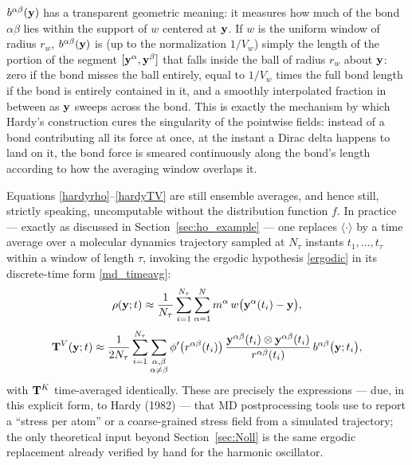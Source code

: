 \begin{remark}\label{rem:bondfunction}
	$b^{\alpha\beta}(\mathbf{y})$ has a transparent geometric meaning: it measures how much of the bond $\alpha\beta$ lies within the support of $w$ centered at $\mathbf{y}$. If $w$ is the uniform window of radius $r_w$, $b^{\alpha\beta}(\mathbf{y})$ is (up to the normalization $1/V_w$) simply the length of the portion of the segment $[\mathbf{y}^\alpha,\mathbf{y}^\beta]$ that falls inside the ball of radius $r_w$ about $\mathbf{y}$: zero if the bond misses the ball entirely, equal to $1/V_w$ times the full bond length if the bond is entirely contained in it, and a smoothly interpolated fraction in between as $\mathbf{y}$ sweeps across the bond. This is exactly the mechanism by which Hardy's construction cures the singularity of the pointwise fields: instead of a bond contributing all its force at once, at the instant a Dirac delta happens to land on it, the bond force is smeared continuously along the bond's length according to how the averaging window overlaps it.
\end{remark}

\begin{remark}\label{rem:hardytime}
	Equations \eqref{hardyrho}--\eqref{hardyTV} are still ensemble averages, and hence still, strictly speaking, uncomputable without the distribution function $f$. In practice --- exactly as discussed in Section~\ref{sec:ho_example} --- one replaces $\langle\cdot\rangle$ by a time average over a molecular dynamics trajectory sampled at $N_\tau$ instants $t_1,\ldots,t_\tau$ within a window of length $\tau$, invoking the ergodic hypothesis \eqref{ergodic} in its discrete-time form \eqref{md_timeavg}:
	\begin{equation}\label{hardyrhotime}
		\rho(\mathbf{y};t) \approx \frac{1}{N_\tau}\sum_{i=1}^{N_\tau}\sum_{\alpha=1}^N m^\alpha\,w\big(\mathbf{y}^\alpha(t_i)-\mathbf{y}\big),
	\end{equation}
	\begin{equation}\label{hardyTVtime}
		\mathbf{T}^V(\mathbf{y};t) \approx \frac{1}{2N_\tau}\sum_{i=1}^{N_\tau}\sum_{\substack{\alpha,\beta\\\alpha\neq\beta}} \phi'\big(r^{\alpha\beta}(t_i)\big)\,\frac{\mathbf{y}^{\alpha\beta}(t_i)\otimes\mathbf{y}^{\alpha\beta}(t_i)}{r^{\alpha\beta}(t_i)}\,b^{\alpha\beta}\big(\mathbf{y};t_i\big),
	\end{equation}
	with $\mathbf{T}^K$ time-averaged identically. These are precisely the expressions --- due, in this explicit form, to Hardy (1982) --- that MD postprocessing tools use to report a ``stress per atom'' or a coarse-grained stress field from a simulated trajectory; the only theoretical input beyond Section~\ref{sec:Noll} is the same ergodic replacement already verified by hand for the harmonic oscillator.
\end{remark}

